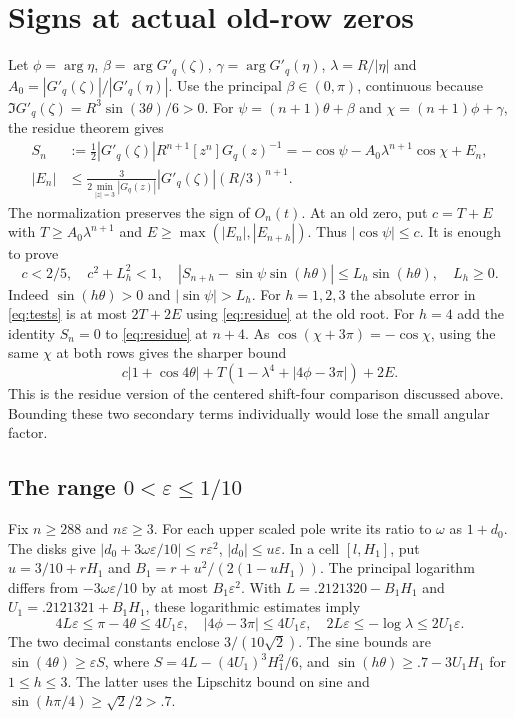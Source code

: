 \documentclass[11pt]{article}
\newcommand{\e}{\varepsilon}
\begin{document}
\section{Signs at actual old-row zeros}
Let $\phi=\arg\eta$, $\beta=\arg G'_q(\zeta)$,
$\gamma=\arg G'_q(\eta)$, $\lambda=R/|\eta|$ and
$A_0=|G'_q(\zeta)|/|G'_q(\eta)|$.
Use the principal $\beta\in(0,\pi)$, continuous because
$\Im G'_q(\zeta)=R^3\sin(3\theta)/6>0$.
For $\psi=(n+1)\theta+\beta$ and $\chi=(n+1)\phi+\gamma$,
the residue theorem gives
\begin{align}
 S_n&:=\tfrac12 |G'_q(\zeta)|R^{n+1}[z^n]G_q(z)^{-1}
 =-\cos\psi-A_0\lambda^{n+1}\cos\chi+E_n,\label{eq:residue}\\
 |E_n|&\le \frac{3}{2\min_{|z|=3}|G_q(z)|}
        |G'_q(\zeta)|(R/3)^{n+1}.\label{eq:E}
\end{align}
The normalization preserves the sign of $O_n(t)$. At an old
zero, put $c=T+E$ with
$T\ge A_0\lambda^{n+1}$ and $E\ge\max(|E_n|,|E_{n+h}|)$.
Thus $|\cos\psi|\le c$. It is enough to prove
\begin{equation}\label{eq:tests}
 c<2/5,\quad c^2+L_h^2<1,\quad
 |S_{n+h}-\sin\psi\sin(h\theta)|\le L_h\sin(h\theta),\quad
 L_h\ge0 .
\end{equation}
Indeed $\sin(h\theta)>0$ and $|\sin\psi|>L_h$.
For $h=1,2,3$ the absolute error in \eqref{eq:tests} is at most
$2T+2E$ using \eqref{eq:residue} at the old root.
For $h=4$ add the identity $S_n=0$ to \eqref{eq:residue} at
$n+4$. As $\cos(\chi+3\pi)=-\cos\chi$, using the same
$\chi$ at both rows gives the sharper bound
\begin{equation}\label{eq:cancel}
 c|1+\cos4\theta|+
 T(1-\lambda^4+|4\phi-3\pi|)+2E.
\end{equation}
This is the residue version of the centered shift-four comparison
discussed above. Bounding these two secondary terms individually
would lose the small angular factor.

\subsection{The range \texorpdfstring{$0<\e\le1/10$}{0 < epsilon <= 1/10}}
Fix $n\ge288$ and $n\e\ge3$. For each upper scaled pole
write its ratio to $\omega$ as $1+d_0$. The disks give
$|d_0+3\omega\e/10|\le r\e^2$, $|d_0|\le u\e$.
In a cell $[l,H_1]$, put $u=3/10+rH_1$ and
$B_1=r+u^2/(2(1-uH_1))$. The principal logarithm differs
from $-3\omega\e/10$ by at most $B_1\e^2$.
With $L=.2121320-B_1H_1$ and $U_1=.2121321+B_1H_1$,
these logarithmic estimates imply
\[
 4L\e\le\pi-4\theta\le4U_1\e,\quad
 |4\phi-3\pi|\le4U_1\e,\quad
 2L\e\le-\log\lambda\le2U_1\e .
\]
The two decimal constants enclose $3/(10\sqrt2)$. The sine
bounds are $\sin(4\theta)\ge\e S$, where
$S=4L-(4U_1)^3H_1^2/6$, and
$\sin(h\theta)\ge .7-3U_1H_1$ for $1\le h\le3$.
The latter uses the Lipschitz bound on sine and
$\sin(h\pi/4)\ge\sqrt2/2>.7$.
\end{document}

